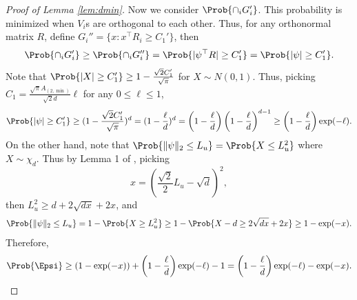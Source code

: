 \begin{proof}[Proof of Lemma \ref{lem:dmin}]
Now we consider $\Prob{\cap_i G_i'}$. 
This probability is minimized when $V_i$s are orthogonal to each other. 
Thus, for any orthonormal matrix $R$, define $G_i'' = \{x: x^{\top}R_i\ge C_1'\}$, then 
\[
\Prob{\cap_i G_i'} \ge \Prob{\cap_i G_i''} = \Prob{|\psi^{\top}R| \ge C_1'} = \Prob{|\psi| \ge C_1'}.
\]
Note that $\Prob{|X|\ge C_1'} \ge 1- \frac{\sqrt{2}C_1'}{\sqrt{\pi}}$ for $X\sim N(0,1)$. Thus, picking $C_1 = \frac{\sqrt{\pi}A_{(2,\min)}}{\sqrt{2}d} \ell$ for any $0\le \ell \le 1$, 
\begin{equation}
\label{eq:GaussianLowerBound}
\Prob{|\psi| \ge C_1'} \ge (1- \frac{\sqrt{2}C_1'}{\sqrt{\pi}})^d = (1-\frac{\ell}{d})^d = \left(1- \frac{\ell}{d}\right)\left(1-\frac{\ell}{d}\right)^{d-1} \ge \left(1- \frac{\ell}{d}\right)\exp(-\ell).
\end{equation}
On the other hand, note that $\Prob{\|\psi\|_2 \le L_u} = \Prob{X \le L_u^2}$ where $X \sim \chi_d$.
Thus by Lemma 1 of \citep{laurent2000adaptive}, picking
\[
x = \left(\frac{\sqrt{2}}{2}L_u - \sqrt{d}\right)^2,
\]
then $L_u^2 \ge d+2\sqrt{dx}+2x$, and
\begin{equation}
\label{eq:ProbEpsi}
\Prob{\|\psi\|_2 \le L_u} = 1- \Prob{X\ge L_u^2} \ge 1- \Prob{X - d\ge 2\sqrt{dx} +2x} \ge 1-\exp(-x).
\end{equation}
Therefore, 
\begin{equation}
\label{eq:ProbEpsi2}
\Prob{\Epsi} \ge (1-\exp(-x))+\left(1- \frac{\ell}{d}\right)\exp(-\ell)-1 = \left(1- \frac{\ell}{d}\right)\exp(-\ell)-\exp(-x).
\end{equation}
\end{proof}

